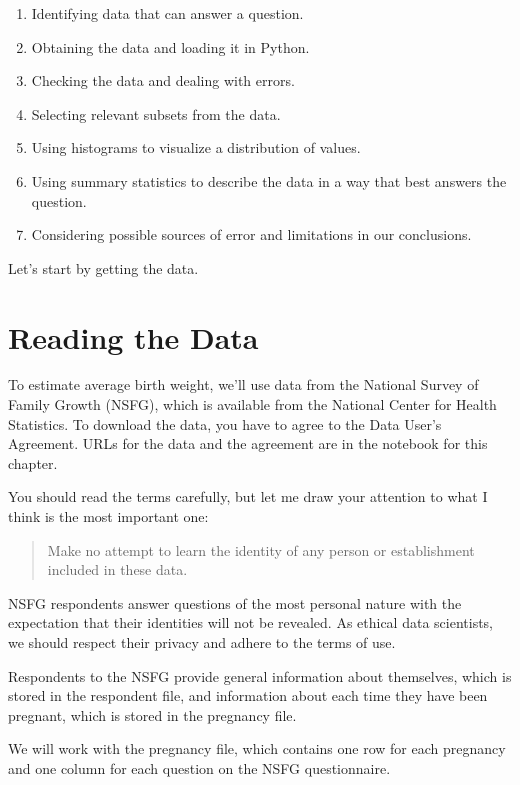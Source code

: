 \documentclass[
]{book}
\begin{document}
\begin{enumerate}
\def\labelenumi{\arabic{enumi}.}
\item
  Identifying data that can answer a question.
\item
  Obtaining the data and loading it in Python.
\item
  Checking the data and dealing with errors.
\item
  Selecting relevant subsets from the data.
\item
  Using histograms to visualize a distribution of values.
\item
  Using summary statistics to describe the data in a way that best
  answers the question.
\item
  Considering possible sources of error and limitations in our
  conclusions.
\end{enumerate}

Let's start by getting the data.

\section{Reading the Data}\label{reading-the-data}

To estimate average birth weight, we'll use data from the National
Survey of Family Growth (NSFG), which is available from the National
Center for Health Statistics. To download the data, you have to agree to
the Data User's Agreement. URLs for the data and the agreement are in
the notebook for this chapter.

You should read the terms carefully, but let me draw your attention to
what I think is the most important one:

\begin{quote}
Make no attempt to learn the identity of any person or establishment
included in these data.
\end{quote}

NSFG respondents answer questions of the most personal nature with the
expectation that their identities will not be revealed. As ethical data
scientists, we should respect their privacy and adhere to the terms of
use.

Respondents to the NSFG provide general information about themselves,
which is stored in the respondent file, and information about each time
they have been pregnant, which is stored in the pregnancy file.

We will work with the pregnancy file, which contains one row for each
pregnancy and one column for each question on the NSFG questionnaire.
\end{document}
